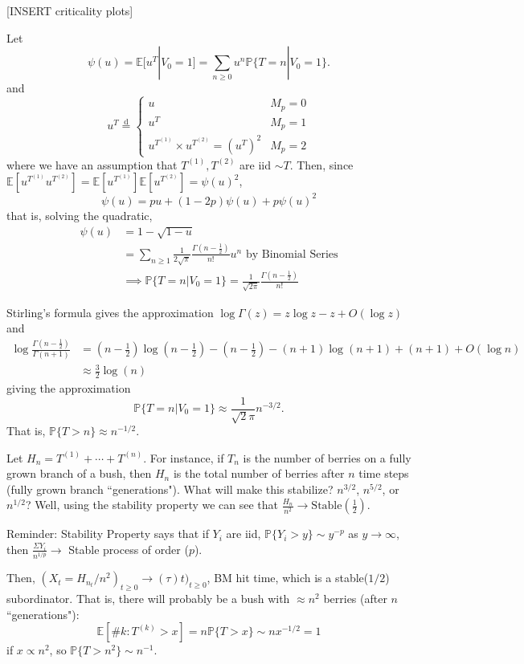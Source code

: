 \documentclass[../../../Master/AppliedStochastics.tex]{subfiles}
\newcommand{\disteq}{\overset{ \text{d} }{=}}
\newcommand{\E}{\mathbb{E}}    %
\renewcommand{\P}{\mathbb{P}}  %
\theoremstyle{definition}
\begin{document}
[INSERT criticality plots]

\bigskip{}
\noindent{}Let 
$$
\psi (u) = \E [u^T | V_0 = 1 ] = \sum_{n \geq 0} u^n \P \{ T = n | V_0 = 1 \}.
$$ 
and
$$
u^T \disteq 
\begin{cases}
u &  M_p = 0 \\
u^T	&	M_p = 1\\
u^{T^{(1)}} \times u^{T^{(2)}} = (u^T)^2	&	M_p = 2
\end{cases}
$$
where we have an assumption that $T^{(1)}, T^{(2)}$ are iid $\sim T$. Then, since $\E [ u^{T^{(1)}} u^{T^{(2)}} ] = \E [ u^{T^{(1)}} ] \E [u^{T^{(2)}} ]  = \psi(u)^2$, 
$$
\psi(u) = pu + (1-2p) \psi(u) + p \psi(u)^2
$$
that is, solving the quadratic,
\begin{align*}
\psi(u) 
	&= 1 - \sqrt{1 - u} \\
	&= \sum_{n \geq 1} \frac{1}{2 \sqrt{\pi}} \frac{ \Gamma (n - \tfrac{1}{2}) }{n!} u^n \text{ by Binomial Series} \\
	&\implies \P \{ T = n | V_0 = 1 \} = \frac{1}{ \sqrt{2 \pi} } \frac{ \Gamma (n - \tfrac{1}{2}) }{n!}
\end{align*}

Stirling's formula gives the approximation $
\log \Gamma(z) 
	= z \log z - z + O(\log z)
$
and
\begin{align*}
\log \frac{ \Gamma(n - \tfrac{1}{2}) }{ \Gamma(n+1) }
	&= (n-\tfrac{1}{2}) \log (n - \tfrac{1}{2}) - (n - \tfrac{1}{2}) - (n+1) \log (n+1) + (n+1) + O(\log n) \\
	&\approx \tfrac{3}{2} \log (n)
\end{align*}
giving the approximation 
$$
\P \{ T = n | V_0 = 1 \} \approx  \frac{1}{\sqrt{2} \pi} n^{-3/2}.
$$ 
That is, $\P \{ T > n \} \approx n^{-1/2}$. \newline{}

\noindent{}Let $H_n = T^{(1)} + \cdots + T^{(n)}$. For instance, if $T_n$ is the number of berries on a fully grown branch of a bush, then $H_n$ is the total number of berries after $n$ time steps (fully grown branch ``generations"). What will make this stabilize? $n^{3/2}$, $n^{5/2}$, or $n^{1/2}$? Well, using the stability property we can see that $\frac{H_n}{n^2} \to \text{Stable}(\tfrac{1}{2})$.

\bigskip{}

Reminder: Stability Property says that if $Y_i$ are iid, $\P \{ Y_i > y \} \sim y^{-p}$ as $y \to \infty$, then $\frac{\Sigma Y_i}{n^{1/p}} \to$ Stable process of order ($p$). 

\bigskip{}

Then, $\left(X_t = H_{n_t} / n^2 \right)_{t \geq 0} \to (\tau)t )_{t \geq 0}$, BM hit time, which is a stable($1/2$) subordinator. That is, there will probably be a bush with $\approx n^2$ berries (after $n$ ``generations"):
$$
\E [ \# k : T^{(k)} > x] = n \P \{ T > x \} \sim n x^{-1/2} = 1
$$
if $x \propto n^2$, so $\P \{ T > n^2 \} \sim n^{-1}$.
\end{document}
